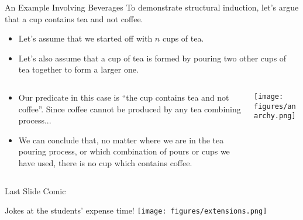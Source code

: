 \documentclass[11pt]{beamer}
\begin{document}
\begin{frame}[fragile=singleslide]{An Example Involving Beverages}
To demonstrate structural induction, let's argue that a cup contains tea and not coffee.
\begin{itemize}
\item Let's assume that we started off with $n$ cups of tea.
\item Let's also assume that a cup of tea is formed by pouring two other cups of tea together to form a larger one.  
\end{itemize}
\vspace{-0.5em}
\begin{columns}
\begin{column}{0.7\textwidth}
\begin{itemize}
\item Our predicate in this case is ``the cup contains tea and not coffee''.  Since coffee cannot be produced by any tea combining process... 
\item We can conclude that, no matter where we are in the tea pouring process, or which combination of pours or cups we have used, there is no cup which contains coffee.  
\end{itemize}
\end{column}
\begin{column}{0.3\textwidth}
\texttt{[image: figures/anarchy.png]}
\end{column}
\end{columns}


\end{frame}

\begin{frame}[fragile=singleslide]{Last Slide Comic}
\begin{center}
Jokes at the students' expense time! 
\texttt{[image: figures/extensions.png]}
\end{center}
\end{frame}
\end{document}
